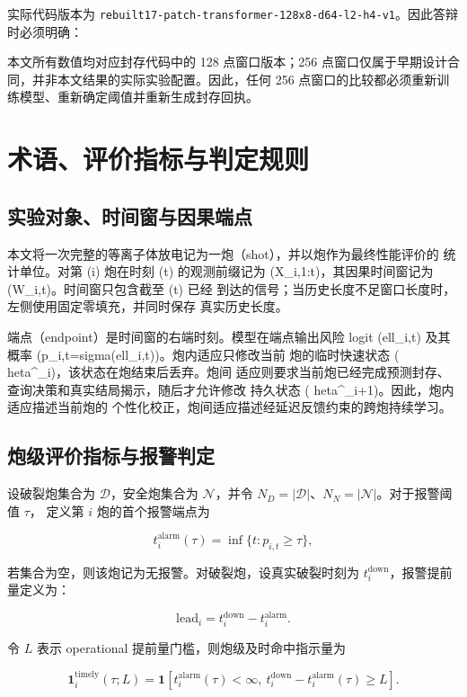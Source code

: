 \documentclass[11pt,a4paper]{article}
\newcommand{\code}[1]{\texttt{\small #1}}
\begin{document}
实际代码版本为
\code{rebuilt17-patch-transformer-128x8-d64-l2-h4-v1}。因此答辩时必须明确：

本文所有数值均对应封存代码中的 128 点窗口版本；256 点窗口仅属于早期设计合同，并非本文结果的实际实验配置。因此，任何 256 点窗口的比较都必须重新训练模型、重新确定阈值并重新生成封存回执。

\section{术语、评价指标与判定规则}

\subsection{实验对象、时间窗与因果端点}

本文将一次完整的等离子体放电记为一炮（shot），并以炮作为最终性能评价的
统计单位。对第 (i) 炮在时刻 (t) 的观测前缀记为
(X_{i,1:t})，其因果时间窗记为 (W_{i,t})。时间窗只包含截至 (t) 已经
到达的信号；当历史长度不足窗口长度时，左侧使用固定零填充，并同时保存
真实历史长度。

端点（endpoint）是时间窗的右端时刻。模型在端点输出风险 logit
(ell_{i,t}) 及其概率 (p_{i,t}=sigma(ell_{i,t}))。炮内适应只修改当前
炮的临时快速状态 (	heta^{}_i)，该状态在炮结束后丢弃。炮间
适应则要求当前炮已经完成预测封存、查询决策和真实结局揭示，随后才允许修改
持久状态 (	heta^{}_{i+1})。因此，炮内适应描述当前炮的
个性化校正，炮间适应描述经延迟反馈约束的跨炮持续学习。

\subsection{炮级评价指标与报警判定}

设破裂炮集合为 \(\mathcal{D}\)，安全炮集合为 \(\mathcal{N}\)，并令
\(N_D=|\mathcal{D}|\)、\(N_N=|\mathcal{N}|\)。对于报警阈值 \(\tau\)，
定义第 \(i\) 炮的首个报警端点为

\[
t_i^{\mathrm{alarm}}(\tau)=\inf\{t:p_{i,t}\geq\tau\},
\]

若集合为空，则该炮记为无报警。对破裂炮，设真实破裂时刻为
\(t_i^{\mathrm{down}}\)，报警提前量定义为：

\[
\mathrm{lead}_i=t_i^{\mathrm{down}}-t_i^{\mathrm{alarm}}.
\]

令 \(L\) 表示 operational 提前量门槛，则炮级及时命中指示量为

\[
\mathbf{1}_{i}^{\mathrm{timely}}(\tau;L)=
\mathbf{1}\!\left[t_i^{\mathrm{alarm}}(\tau)<\infty,
\ t_i^{\mathrm{down}}-t_i^{\mathrm{alarm}}(\tau)\geq L\right].
\]
\end{document}
